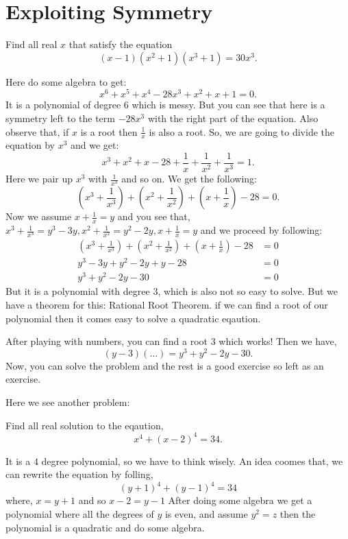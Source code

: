 \section{Exploiting Symmetry}
\begin{example}
Find all real $x$ that satisfy the equation
\[(x-1)(x^2+1)(x^3+1)=30x^3.\]
\end{example}
Here do some algebra to get:
\[x^6 + x^5 + x^4 -28x^3 +x^2 +x+1=0.\]
It is a polynomial of degree $6$ which is messy.
But you can see that here is a symmetry left to the term $-28x^3$ with the right part of the equation. 
Also observe that, if $x$ is a root then $\frac{1}{x}$ is also a root. 
So, we are going to divide the equation by $x^3$ and we get:
\[x^3+x^2 +x -28 +\frac{1}{x}+\frac{1}{x^2}+\frac{1}{x^3}=1.\]
Here we pair up $x^3$ with $\frac{1}{x^3}$ and so on. We get the following: 
\[\left(x^3+\frac{1}{x^3}\right)+\left(x^2+\frac{1}{x^2}\right)+\left(x+\frac{1}{x}\right)-28=0.\]
Now we assume $x+\frac{1}{x}=y$ and you see that, $x^3+\frac{1}{x^3}=y^3-3y, x^2+\frac{1}{x^2} =y^2-2y, x+\frac{1}{x}=y$ and we proceed by following:
\begin{align*}
\left(x^3+\frac{1}{x^3}\right)+\left(x^2+\frac{1}{x^2}\right)+\left(x+\frac{1}{x}\right)-28&=0\\
y^3 -3y +y^2 -2y +y-28 &=0\\
y^3 +y^2 -2y-30 &=0
\end{align*}
But it is a polynomial with degree $3$, which is also not so easy to solve. But we have a theorem for this: Rational Root Theorem.
if we can find a root of our polynomial then it comes easy to solve a quadratic eqaution.

After playing with numbers, you can find a root $3$ which works!
Then we have, \[(y-3)(\ldots)=y^3+y^2-2y-30.\]
Now, you can solve the problem  and the rest is a good exercise so left as an exercise.

Here we see another problem:
\begin{example}
Find all real solution to the eqaution,
\[x^4 +(x-2)^4=34.\]
\end{example}
It is a $4$ degree polynomial, so we have to think wisely.
An idea coomes that, we can rewrite the equation by folling, \[(y+1)^4+(y-1)^4=34\]
where, $x=y+1$ and so $x-2=y-1$ After doing 
some algebra we get a polynomial where all 
the degrees of $y$ is even, and assume $y^2=z$ 
then the polynomial is a quadratic and do some algebra.

